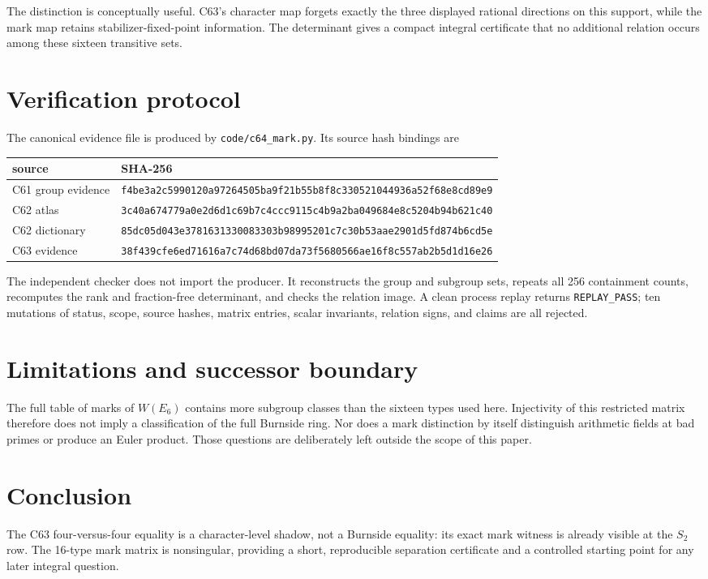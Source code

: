 \documentclass[10pt]{article}
\begin{document}
The distinction is conceptually useful.  C63's character map forgets exactly
the three displayed rational directions on this support, while the mark map
retains stabilizer-fixed-point information.  The determinant gives a compact
integral certificate that no additional relation occurs among these sixteen
transitive sets.

\section{Verification protocol}
The canonical evidence file is produced by \texttt{code/c64\_mark.py}.  Its source
hash bindings are
\begin{center}
\begin{tabular}{ll}
source & SHA-256\\ \midrule
C61 group evidence & \texttt{f4be3a2c5990120a97264505ba9f21b55b8f8c330521044936a52f68e8cd89e9}\\
C62 atlas & \texttt{3c40a674779a0e2d6d1c69b7c4ccc9115c4b9a2ba049684e8c5204b94b621c40}\\
C62 dictionary & \texttt{85dc05d043e3781631330083303b98995201c7c30b53aae2901d5fd874b6cd5e}\\
C63 evidence & \texttt{38f439cfe6ed71616a7c74d68bd07da73f5680566ae16f8c557ab2b5d1d16e26}
\end{tabular}
\end{center}

The independent checker does not import the producer.  It reconstructs the
group and subgroup sets, repeats all 256 containment counts, recomputes the
rank and fraction-free determinant, and checks the relation image.  A clean
process replay returns \texttt{REPLAY\_PASS}; ten mutations of status, scope, source
hashes, matrix entries, scalar invariants, relation signs, and claims are all
rejected.

\section{Limitations and successor boundary}
The full table of marks of $W(E_6)$ contains more subgroup classes than the
sixteen types used here.  Injectivity of this restricted matrix therefore does
not imply a classification of the full Burnside ring.  Nor does a mark
distinction by itself distinguish arithmetic fields at bad primes or produce
an Euler product.  Those questions are deliberately left outside the scope
of this paper.

\section{Conclusion}
The C63 four-versus-four equality is a character-level shadow, not a Burnside
equality: its exact mark witness is already visible at the $S_2$ row.  The
16-type mark matrix is nonsingular, providing a short, reproducible separation
certificate and a controlled starting point for any later integral question.



\end{document}
